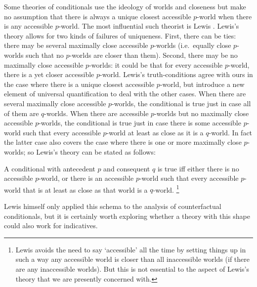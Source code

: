 \documentclass[If.tex]{subfiles}
\begin{document}
Some theories of conditionals use the ideology of worlds and closeness but make no assumption that there is always a unique closest accessible $p$-world when there is any accessible $p$-world. The most influential such theorist is Lewis \citeyearpar{LewisCounterfactuals}. Lewis's theory allows for two kinds of failures of uniqueness. First, there can be ties: there may be several maximally close accessible $p$-worlds (i.e.\ equally close $p$-worlds such that no $p$-worlds are closer than them). Second, there may be no maximally close accessible $p$-worlds: it could be that for every accessible $p$-world, there is a yet closer accessible $p$-world. Lewis's truth-conditions agree with ours in the case where there is a unique closest accessible $p$-world, but introduce a new element of universal quantification to deal with the other cases. When there are several maximally close accessible $p$-worlds, the conditional is true just in case all of them are $q$-worlds. When there are accessible $p$-worlds but no maximally close accessible $p$-worlds, the conditional is true just in case there is some accessible $p$-world such that every accessible $p$-world at least as close as it is a $q$-world. In fact the latter case also covers the case where there is one or more maximally close $p$-worlds; so Lewis's theory can be stated as follows:
\begin{prop}
\litem[LEWIS] \label{lewis}
	A conditional with antecedent $p$ and consequent $q$ is true iff either there is no accessible $p$-world, or there is an accessible $p$-world such that every accessible $p$-world that is at least as close as that world is a $q$-world.%
	\footnote{Lewis avoids the need to say ‘accessible’ all the time by setting things up in such a way any accessible world is closer than all inaccessible worlds (if there are any inaccessible worlds). But this is not essential to the aspect of Lewis's theory that we are presently concerned with.} 
\end{prop}
Lewis himself only applied this schema to the analysis of counterfactual conditionals, but it is certainly worth exploring whether a theory with this shape could also work for indicatives.
\end{document}
